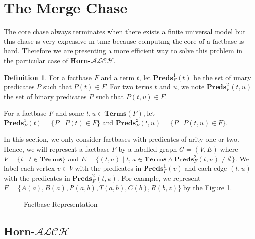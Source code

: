 \documentclass{article}
\theoremstyle{definition}
\newtheorem{definition}{Definition}[section]
\theoremstyle{remark}
\newcommand{\Terms}{\textbf{Terms}}
\newcommand{\Preds}{\textbf{Preds}}
\newcommand{\ALCH}{\textbf{Horn-$\mathcal{ALCH}$}}
\begin{document}
\section{The Merge Chase}

The core chase always terminates when there exists a finite universal model but this chase is very expensive in time because computing the core of a factbase is hard. Therefore we are presenting a more efficient way to solve this problem in the particular case of \ALCH.

\begin{definition}
For a factbase $F$ and a term $t$, let \emph{$\Preds^1_F(t)$} be the set of unary predicates $P$ such that $P(t)\in F$. For two terms $t$ and $u$, we note \emph{$\Preds^2_F(t,u)$} the set of binary predicates $P$ such that $P(t,u)\in F$. 

For a factbase $F$ and some $t, u \in \Terms(F)$, let $\Preds^1_F(t) = \{P \mid P(t) \in F\}$ and $\Preds^2_F(t, u) = \{P \mid P(t, u) \in F\}$.
\end{definition}

In this section, we only consider factbases with predicates of arity one or two. Hence, we will represent a factbase $F$ by a labelled graph $G = (V,E)$ where $V = \{t \mid t \in \Terms \}$ and $E = \{(t,u) \mid t,u \in \Terms \wedge \Preds_F^2(t,u) \neq \emptyset\}$. We label each vertex $v \in V$ with the predicates in $\Preds_F^1(v)$ and each edge $(t, u)$ with the predicates in $\Preds^2_F(t, u)$. For example, we represent $F = \{A(a), B(a),R(a,b),T(a,b),C(b),R(b,z)\}$ by the Figure \ref{figure:graph}.

\begin{figure}

\caption{Factbase Representation}
\label{figure:graph}
\end{figure}

\subsection{\ALCH }
\end{document}
